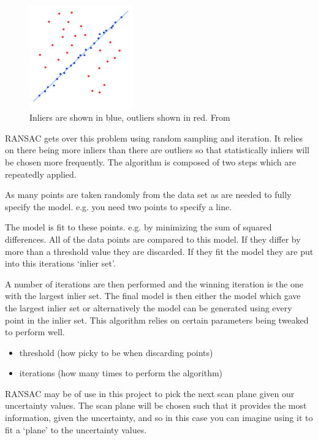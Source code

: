 \documentclass[
  oneside,
  11pt, a4paper,
  footinclude=true,
  headinclude=true,
  cleardoublepage=empty
]{scrbook}
\begin{document}
\begin{figure}[h]
    \centering
	\includegraphics[width=0.4\textwidth]{images/ransac.png}
    \caption{Inliers are shown in blue, outliers shown in red. From \cite{ransac:image}}
    \label{fig:ransac}
\end{figure}

RANSAC gets over this problem using random sampling and iteration. It relies on there being more inliers than there are outliers so that statistically inliers will be chosen more frequently. The algorithm is composed of two steps which are repeatedly applied.

As many points are taken randomly from the data set as are needed to fully specify the model. e.g. you need two points to specify a line.

The model is fit to these points. e.g. by minimizing the sum of squared differences.
All of the data points are compared to this model. If they differ by more than a threshold value they are discarded. If they fit the model they are put into this iterations ‘inlier set’.

A number of iterations are then performed and the winning iteration is the one with the largest inlier set. The final model is then either the model which gave the largest inlier set or alternatively the model can be generated using every point in the inlier set.
This algorithm relies on certain parameters being tweaked to perform well.

\begin{itemize}
	\item threshold (how picky to be when discarding points)
	\item iterations (how many times to perform the algorithm)
\end{itemize}

RANSAC may be of use in this project to pick the next scan plane given our uncertainty values. The scan plane will be chosen such that it provides the most information, given the uncertainty, and so in this case you can imagine using it to fit a ‘plane’ to the uncertainty values.
\end{document}
